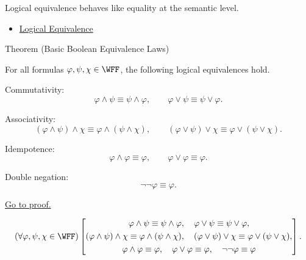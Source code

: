 \begin{remark*}[Interpretation]
Logical equivalence behaves like equality at the semantic level.
\end{remark*}

\begin{dependencies}
\begin{itemize}
  \item \hyperref[def:logical-equivalence-propositional-logic]{Logical Equivalence}
\end{itemize}
\end{dependencies}
\begin{theorembox}{Theorem (Basic Boolean Equivalence Laws)}
\begin{theorem}
\label{thm:basic-boolean-equivalence-laws-propositional-logic}
For all formulas \(\varphi,\psi,\chi\in\WFF\), the following logical equivalences hold.

Commutativity:
\[
\varphi\land\psi\equiv\psi\land\varphi,
\qquad
\varphi\lor\psi\equiv\psi\lor\varphi.
\]

Associativity:
\[
(\varphi\land\psi)\land\chi
\equiv
\varphi\land(\psi\land\chi),
\qquad
(\varphi\lor\psi)\lor\chi
\equiv
\varphi\lor(\psi\lor\chi).
\]

Idempotence:
\[
\varphi\land\varphi\equiv\varphi,
\qquad
\varphi\lor\varphi\equiv\varphi.
\]

Double negation:
\[
\neg\neg\varphi\equiv\varphi.
\]

\noindent\hyperref[prf:basic-boolean-equivalence-laws-propositional-logic]{Go to proof.}
\end{theorem}
\end{theorembox}

\begin{remark*}
\[
(\forall\varphi,\psi,\chi\in\WFF)
\left[
\begin{gathered}
\varphi\land\psi\equiv\psi\land\varphi,\quad
\varphi\lor\psi\equiv\psi\lor\varphi,\\
(\varphi\land\psi)\land\chi\equiv\varphi\land(\psi\land\chi),\quad
(\varphi\lor\psi)\lor\chi\equiv\varphi\lor(\psi\lor\chi),\\
\varphi\land\varphi\equiv\varphi,\quad
\varphi\lor\varphi\equiv\varphi,\quad
\neg\neg\varphi\equiv\varphi
\end{gathered}
\right].
\]
\end{remark*}


